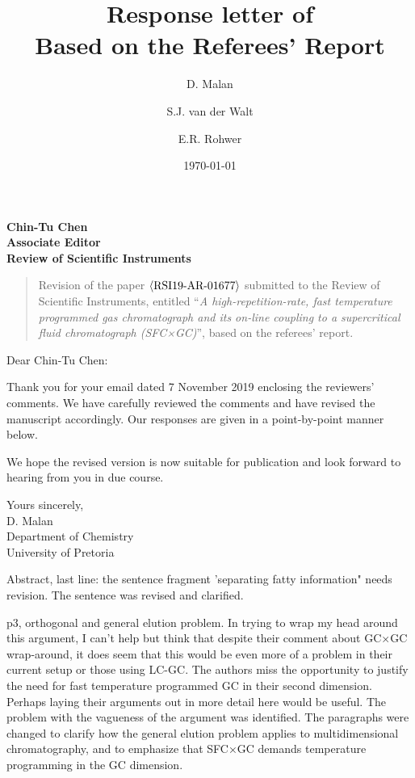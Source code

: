 \documentclass[10pt]{article}
\title{Response letter of \meta{RSI19-AR-01677} \\
  Based on the Referees' Report}
\author{D. Malan \and S.J. van der Walt \and E.R. Rohwer}
\date{\today}
\newcommand\meta[1]{$\langle\hbox{#1}\rangle$}
\newcommand\PaperTitle[1]{``\textit{#1}''}
\begin{document}
\noindent
\textbf{Chin-Tu Chen}\\
\textbf{Associate Editor}\\
\textbf{Review of Scientific Instruments}

\medskip

\begin{quote}
Revision of the paper \meta{RSI19-AR-01677} submitted to the Review of
Scientific Instruments, entitled \PaperTitle{A high-repetition-rate, fast
temperature programmed gas chromatograph and its on-line coupling to a
supercritical fluid chromatograph (SFC×GC)}, based on the referees' report.
\end{quote}

\medskip

\noindent
Dear Chin-Tu Chen: 

Thank you for your email dated 7 November 2019 enclosing the reviewers’ comments. We
have carefully reviewed the comments and have revised the manuscript accordingly. Our
responses are given in a point-by-point manner below. 

We hope the revised version is now suitable for publication and look forward to hearing from you
in due course.

\vspace{\baselineskip}

\noindent
Yours sincerely,\\
D. Malan\\
Department of Chemistry\\
University of Pretoria


\begin{response}{Abstract, last line: the sentence fragment 'separating fatty information" needs revision.
	}
 	The sentence was revised and clarified.
\end{response}

\begin{response}{p3, orthogonal and general elution problem. In trying to wrap
my head around this argument, I can't help but think that despite their comment
about GC×GC wrap-around, it does seem that this would be even more of a problem
in their current setup or those using LC-GC. The authors miss the opportunity to
justify the need for fast temperature programmed GC in their second dimension.
Perhaps laying their arguments out in more detail here would be useful.
} 
The problem with the vagueness of the argument was identified. The paragraphs
were changed to clarify how the general elution problem applies to
multidimensional chromatography, and to emphasize that SFC×GC demands
temperature programming in the GC dimension.
\end{response}
\end{document}
